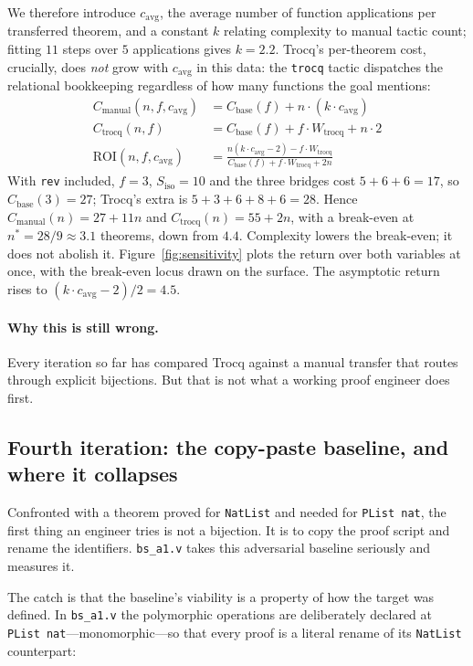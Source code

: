 \documentclass[runningheads]{llncs}
\begin{document}
We therefore introduce $c_{\text{avg}}$, the average number of function
applications per transferred theorem, and a constant $k$ relating complexity
to manual tactic count; fitting $11$ steps over $5$ applications gives
$k=2.2$. Trocq's per-theorem cost, crucially, does \emph{not} grow with
$c_{\text{avg}}$ in this data: the \texttt{trocq} tactic dispatches the
relational bookkeeping regardless of how many functions the goal mentions:
\begin{align}
C_{\text{manual}}(n,f,c_{\text{avg}}) &= C_{\text{base}}(f) + n \cdot (k \cdot c_{\text{avg}}) \\
C_{\text{trocq}}(n,f) &= C_{\text{base}}(f) + f \cdot W_{\text{trocq}} + n \cdot 2 \\
\mathrm{ROI}(n,f,c_{\text{avg}}) &= \frac{n(k \cdot c_{\text{avg}} - 2) - f \cdot W_{\text{trocq}}}{C_{\text{base}}(f) + f \cdot W_{\text{trocq}} + 2n}
\end{align}
With \texttt{rev} included, $f=3$, $S_{\text{iso}}=10$ and the three bridges
cost $5+6+6=17$, so $C_{\text{base}}(3)=27$; Trocq's extra is
$5+3+6+8+6=28$. Hence $C_{\text{manual}}(n) = 27+11n$ and
$C_{\text{trocq}}(n) = 55+2n$, with a break-even at
$n^{*} = 28/9 \approx 3.1$ theorems, down from $4.4$. Complexity lowers the
break-even; it does not abolish it. Figure~\ref{fig:sensitivity} plots the
return over both variables at once, with the break-even locus drawn on the
surface. The asymptotic return rises to
$(k\cdot c_{\text{avg}}-2)/2 = 4.5$.

\paragraph{Why this is still wrong.} Every iteration so far has compared
Trocq against a manual transfer that routes through explicit bijections. But
that is not what a working proof engineer does first.

\subsection{Fourth iteration: the copy-paste baseline, and where it collapses}
\label{sec:fourth}

Confronted with a theorem proved for \texttt{NatList} and needed for
\texttt{PList nat}, the first thing an engineer tries is not a bijection. It
is to copy the proof script and rename the identifiers. \texttt{bs\_a1.v}
takes this adversarial baseline seriously and measures it.

The catch is that the baseline's viability is a property of how the target
was defined. In \texttt{bs\_a1.v} the polymorphic operations are deliberately
declared at \texttt{PList nat}---monomorphic---so that every proof is a
literal rename of its \texttt{NatList} counterpart:
\end{document}
